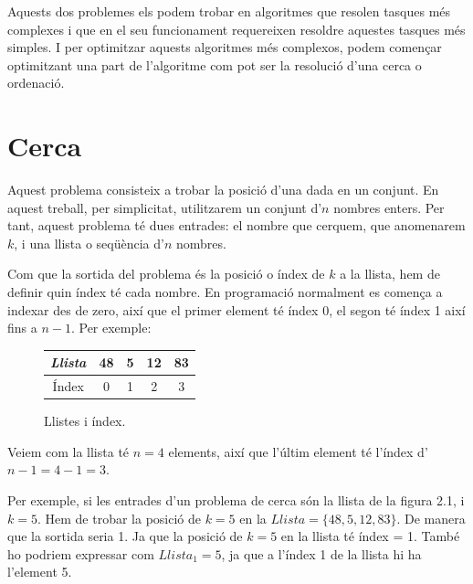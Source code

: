 
Aquests dos problemes els podem trobar en algoritmes que resolen tasques més complexes i que en el seu funcionament requereixen resoldre aquestes tasques més simples. I per optimitzar aquests algoritmes més complexos, podem començar optimitzant una part de l'algoritme com pot ser la resolució d'una cerca o ordenació.
\section{Cerca}
Aquest problema consisteix a trobar la posició d'una dada en un conjunt. En aquest treball, per simplicitat, utilitzarem un conjunt d'$n$ nombres enters. Per tant, aquest problema té dues entrades: el nombre que cerquem, que anomenarem $k$, i una llista o seqüència d'$n$ nombres. 

Com que la sortida del problema és la posició o índex de $k$ a la llista, hem de definir quin índex té cada nombre. En programació normalment es comença a indexar des de zero, així que el primer element té índex 0, el segon té índex 1 així fins a $n-1$. Per exemple:
\begin{figure}[h]
    \begin{center}
    \renewcommand{\arraystretch}{1.5}
    \begin{tabular}{|c | c | c | c | c |} 
     \hline
     \textit{Llista} & 48 & 5 & 12 & 83 \\ 
     \hline
     Índex & 0 & 1 & 2 & 3 \\
     \hline
    \end{tabular}
    \end{center}
    \caption{Llistes i índex.}
    \label{fig:my_label}
\end{figure} 

Veiem com la llista té $n = 4$ elements, així que l'últim element té l'índex d'$n-1 = 4-1 = 3$. 

Per exemple, si les entrades d'un problema de cerca són la llista de la figura 2.1, i $k = 5$. Hem de trobar la posició de $k = 5$ en la $Llista = \lbrace 48, 5, 12, 83 \rbrace$. De manera que la sortida seria 1. Ja que la posició de $k = 5$ en la llista té índex = 1. També ho podriem expressar com $Llista_1 = 5$, ja que a l'índex 1 de la llista hi ha l'element 5.

